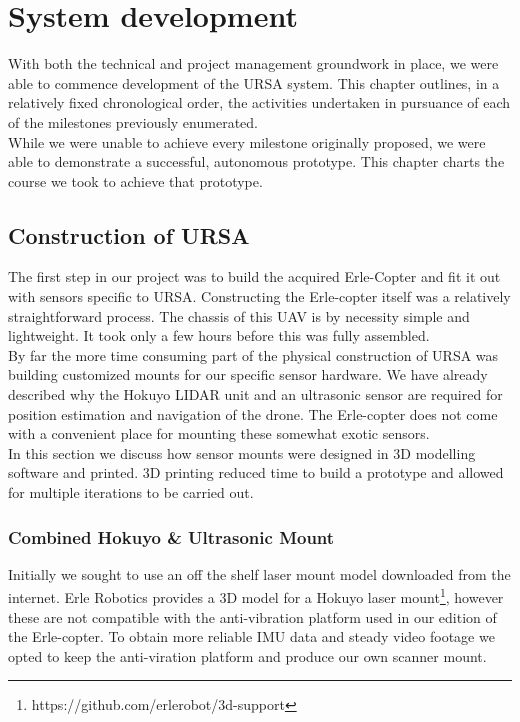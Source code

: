 \documentclass[capstone_report.tex]{subfiles}
\begin{document}
\chapter{System development}
With both the technical and project management groundwork in place, we were able to commence development of the URSA system. This chapter outlines, in a relatively fixed chronological order, the activities undertaken in pursuance of each of the milestones previously enumerated. \\

While we were unable to achieve every milestone originally proposed, we were able to demonstrate a successful, autonomous prototype. This chapter charts the course we took to achieve that prototype.
\pagebreak

\section{Construction of URSA}
The first step in our project was to build the acquired Erle-Copter and fit it out with sensors specific to URSA. Constructing the Erle-copter itself was a relatively straightforward process. The chassis of this UAV is by necessity simple and lightweight. It took only a few hours before this was fully assembled.\\

By far the more time consuming part of the physical construction of URSA was building customized mounts for our specific sensor hardware. We have already described why the Hokuyo LIDAR unit and an ultrasonic sensor are required for position estimation and navigation of the drone. The Erle-copter does not come with a convenient place for mounting these somewhat exotic sensors.\\

In this section we discuss how sensor mounts were designed in 3D modelling software and printed. 3D printing reduced time to build a prototype and allowed for multiple iterations to be carried out.

\subsection{Combined Hokuyo \& Ultrasonic Mount}
Initially we sought to use an off the shelf laser mount model downloaded from the internet. Erle Robotics provides a 3D model for a Hokuyo laser mount\footnote{https://github.com/erlerobot/3d-support}, however these are not compatible with the anti-vibration platform used in our edition of the Erle-copter. To obtain more reliable IMU data and steady video footage we opted to keep the anti-viration platform and produce our own scanner mount.\\
\end{document}
